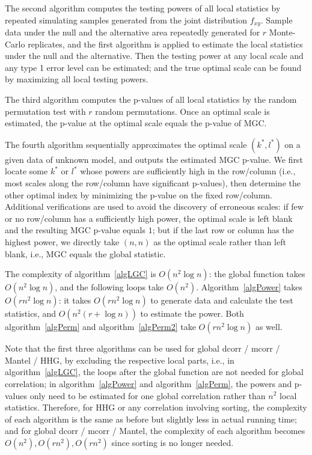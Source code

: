 \documentclass[11pt]{article}
\begin{document}
The second algorithm computes the testing powers of all local statistics by repeated simulating samples generated from the joint distribution $f_{xy}$. Sample data under the null and the alternative area repeatedly generated for $r$ Monte-Carlo replicates, and the first algorithm is applied to estimate the local statistics under the null and the alternative. Then the testing power at any local scale and any type 1 error level can be estimated; and the true optimal scale can be found by maximizing all local testing powers.

The third algorithm computes the p-values of all local statistics by the random permutation test with $r$ random permutations. Once an optimal scale is estimated, the p-value at the optimal scale equals the p-value of MGC.

The fourth algorithm sequentially approximates the optimal scale $(k^{*},l^{*})$ on a given data of unknown model, and outputs the estimated MGC p-value. We first locate some $k^{*}$ or $l^{*}$ whose powers are sufficiently high in the row/column (i.e., most scales along the row/column have significant p-values), then determine the other optimal index by minimizing the p-value on the fixed row/column. Additional verifications are used to avoid the discovery of erroneous scales: if few or no row/column has a sufficiently high power, the optimal scale is left blank and the resulting MGC p-value equals $1$; but if the last row or column has the highest power, we directly take $(n,n)$ as the optimal scale rather than left blank, i.e., MGC equals the global statistic.

The complexity of algorithm~\ref{algLGC} is $O(n^2 \log n)$: the global function takes $O(n^2 \log n)$, and the following loops take $O(n^2)$. Algorithm~\ref{algPower} takes $O(rn^2 \log n)$: it takes $O(rn^2 \log n)$ to generate data and calculate the test statistics, and $O(n^2 (r+\log n))$ to estimate the power. Both algorithm~\ref{algPerm} and algorithm~\ref{algPerm2} take $O(rn^2 \log n)$ as well. 

Note that the first three algorithms can be used for global dcorr / mcorr / Mantel / HHG, by excluding the respective local parts, i.e., in algorithm~\ref{algLGC}, the loops after the global function are not needed for global correlation; in algorithm~\ref{algPower} and algorithm~\ref{algPerm}, the powers and p-values only need to be estimated for one global correlation rather than $n^2$ local statistics. Therefore, for HHG or any correlation involving sorting, the complexity of each algorithm is the same as before but slightly less in actual running time; and for global dcorr / mcorr / Mantel, the complexity of each algorithm becomes $O(n^2), O(rn^2), O(rn^2)$ since sorting is no longer needed.
\end{document}
